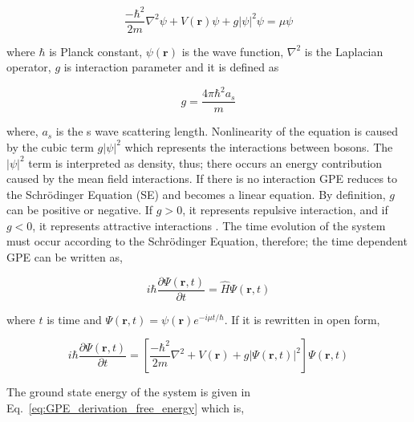 \documentclass[a4paper,times,hidelinks,12pt]{article}
\begin{document}
\begin{equation}
\label{eq:GPE_time_indep}
\frac{-\hbar^2}{2m}\nabla^2\psi + V(\boldsymbol{r})\psi + g|\psi|^2\psi = \mu\psi
\end{equation}

%

\noindent where $\hbar$ is Planck constant, $\psi(\boldsymbol{r})$ is the wave function, $\nabla^2$ is the Laplacian operator, $g$ is interaction parameter and it is defined as 

\begin{equation}
\label{eq:GPE_inter_param}
g=\frac{4\pi\hbar^2a_s}{m}
\end{equation}

\noindent where, $a_s$ is the s wave scattering length. Nonlinearity of the equation is caused by the cubic term $g|\psi|^2$ which represents the interactions between bosons. The $|\psi|^2$ term is interpreted as density, thus; there occurs an energy contribution caused by the mean field interactions. If there is no interaction GPE reduces to the Schr{\"o}dinger Equation (SE) and becomes a linear equation. By definition, $g$ can be positive or negative. If $g > 0$, it represents repulsive interaction, and if $g < 0$, it represents attractive interactions \cite{barenghi2016primer}. The time evolution of the system must occur according to the Schr{\"o}dinger Equation, therefore; the time dependent GPE can be written as,

\begin{equation}
\label{eq:GPE_time_evolution}
i \hbar \frac{\partial\Psi(\boldsymbol{r}, t)}{\partial t} = \hat{H}\Psi(\boldsymbol{r}, t)
\end{equation}

where $t$ is time and $\Psi(\boldsymbol{r}, t) = \psi(\boldsymbol{r})e^{-i\mu t/\hbar} $. If it is rewritten in open form,

\begin{equation}
\label{eq:GPE_time_indep}
i \hbar \frac{\partial\Psi(\boldsymbol{r}, t)}{\partial t} = [\frac{-\hbar^2}{2m}\nabla^2 + V(\boldsymbol{r}) + g|\Psi(\boldsymbol{r}, t)|^2 ] \Psi(\boldsymbol{r}, t)
\end{equation}

The ground state energy of the system is given in Eq.~\eqref{eq:GPE_derivation_free_energy} which is,
\end{document}
